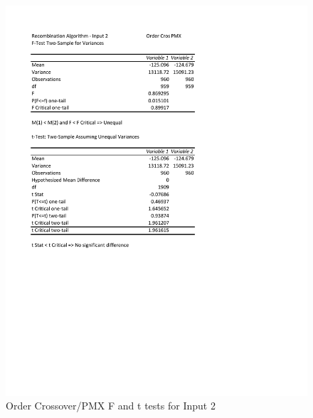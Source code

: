 \documentclass[times]{article}
\begin{document}
	\begin{figure}
		\caption{Order Crossover/PMX F and t tests for Input 2}
		\label{fig:recombination2}
		\includegraphics[width=\textwidth]{./t_test/Recombination2}
	\end{figure}
\end{document}
